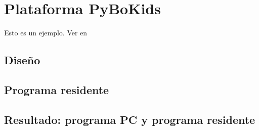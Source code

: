 \chapter{Plataforma PyBoKids}
\label{cap:PyBoKids}

Esto es un ejemplo. Ver en  \cite{darwin2009origen} \cite{del1984luces}

\section{Diseño}\label{sec:diseño}

\section{Programa residente}\label{sec:residente}

\section{Resultado: programa PC y programa residente}\label{resultado}